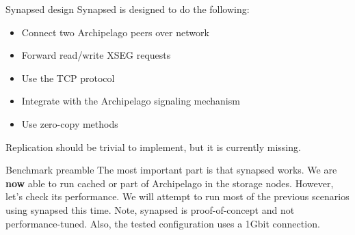 \begin{frame}{Synapsed design}
	Synapsed is designed to do the following:
	\begin{itemize}
		\item Connect two Archipelago peers over network
		\item Forward read/write XSEG requests
		\item Use the TCP protocol
		\item Integrate with the Archipelago signaling mechanism
		\item Use zero-copy methods
	\end{itemize}
	\dspc
	Replication should be trivial to implement, but it is currently missing.


\end{frame}

\begin{frame}{Benchmark preamble}
	The most important part is that synapsed works. We are \textbf{now} able to
	run cached or part of Archipelago in the storage nodes.
	\dspc
	However, let's check its performance.
	\spc
	We will attempt to run most of the previous scenarios using synapsed this 
	time.
	\dspc
	Note, synapsed is proof-of-concept and not performance-tuned. Also, the 
	tested configuration uses a 1Gbit connection.
\end{frame}

